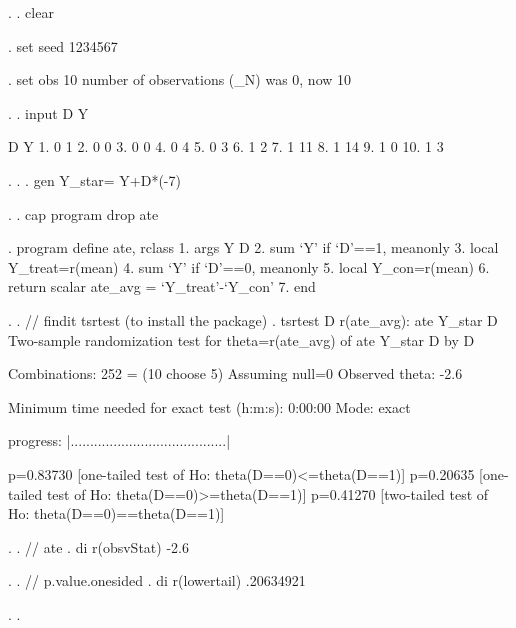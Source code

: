 . 
. clear

. set seed 1234567

. set obs 10
number of observations (_N) was 0, now 10

. 
. input D Y

             D          Y
  1. 0 1 
  2. 0 0 
  3. 0 0 
  4. 0 4 
  5. 0 3 
  6. 1 2 
  7. 1 11 
  8. 1 14 
  9. 1 0 
 10. 1 3 

. 
. 
. gen Y_star= Y+D*(-7)

. 
. cap program drop ate

. program define ate, rclass
  1.         args Y D
  2.         sum `Y' if `D'==1, meanonly
  3.         local Y_treat=r(mean)
  4.         sum `Y' if `D'==0, meanonly
  5.         local Y_con=r(mean)
  6.         return scalar ate_avg = `Y_treat'-`Y_con'
  7. end

. 
. // findit tsrtest (to install the package)
. tsrtest D r(ate_avg): ate Y_star D
Two-sample randomization test for theta=r(ate_avg) of ate Y_star D by D

Combinations:   252 = (10 choose 5)
Assuming null=0
Observed theta: -2.6

Minimum time needed for exact test (h:m:s):  0:00:00
Mode: exact

progress: |........................................|

 p=0.83730 [one-tailed test of Ho:  theta(D==0)<=theta(D==1)]
 p=0.20635 [one-tailed test of Ho:  theta(D==0)>=theta(D==1)]
 p=0.41270 [two-tailed test of Ho:  theta(D==0)==theta(D==1)]

. 
. // ate
. di r(obsvStat)       
-2.6

. 
. // p.value.onesided
. di r(lowertail)   
.20634921

. 
. 
